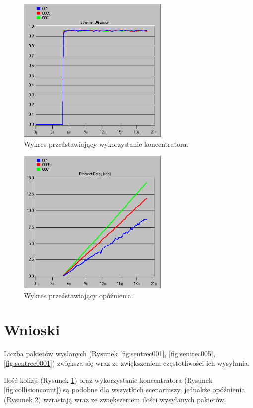 \documentclass{article}
\begin{document}
\begin{figure}[H]
  \centering
  \includegraphics[width=0.65\textwidth]{screens/samo/koncentrator_utilization.png}
  \caption{Wykres przedstawiający wykorzystanie koncentratora.}
  \label{fig:utilization}
\end{figure}


\begin{figure}[H]
  \centering
  \includegraphics[width=0.65\textwidth]{screens/samo/delay.png}
  \caption{Wykres przedstawiający opóźnienia.}
  \label{fig:delay}
\end{figure}

\section{Wnioski}
Liczba pakietów wysłanych (Rysunek \ref{fig:sentrec001}, \ref{fig:sentrec005}, \ref{fig:sentrec0001}) zwiększa się wraz ze zwiększeniem częstotliwości ich wysyłania.

Ilość kolizji (Rysunek \ref{fig:utilization}) oraz wykorzystanie koncentratora (Rysunek \ref{fig:collisioncount}) są podobne dla wszystkich scenariuszy, jednakże opóźnienia (Rysunek \ref{fig:delay}) wzrastają wraz ze zwiększeniem ilości wysyłanych pakietów.
\end{document}
